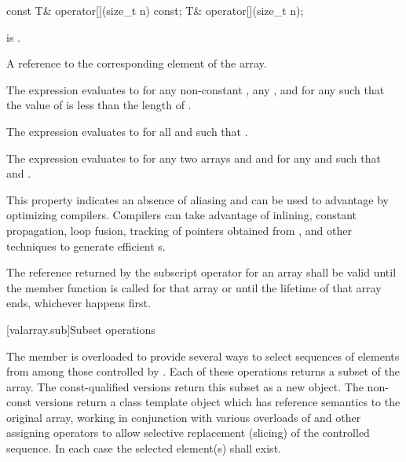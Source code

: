 %
\begin{itemdecl}
const T& operator[](size_t n) const;
T& operator[](size_t n);
\end{itemdecl}

\begin{itemdescr}
\pnum
\hardexpects
{} is .

\pnum
\returns
A reference to the corresponding element of the array.
\begin{note}
The expression 
evaluates to  for any non-constant ,
any , and for any 
such that the value of  is less than the length of .
\end{note}

\pnum
\remarks
The expression 
evaluates to  for all  and 
such that .

\pnum
The expression 
evaluates to  for any two arrays
 and  and for any
 and 
such that 
and .
\begin{note}
This property indicates an absence of aliasing and can be used to
advantage by optimizing compilers. Compilers can take advantage
of inlining, constant propagation, loop fusion,
tracking of pointers obtained from
,
and other techniques to generate efficient
s.
\end{note}

\pnum
The reference returned by the subscript operator for an array shall
be valid until the member function
 is called for that array or until the lifetime of
that array ends, whichever happens first.
\end{itemdescr}

[valarray.sub]{Subset operations}

%
\pnum
The member  is overloaded to provide several ways to select
sequences of elements from among those controlled by . Each of these
operations returns a subset of the array. The const-qualified versions return this
subset as a new  object. The non-const versions return a class
template object which has reference semantics to the original array, working in
conjunction with various overloads of  and other assigning
operators to allow selective replacement (slicing) of the controlled sequence.
In each case the selected element(s) shall exist.

